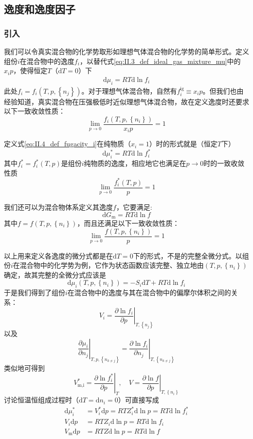 \documentclass[main.tex]{subfiles}
\begin{document}
\subsection{逸度和逸度因子}
\subsubsection{引入}
我们可以令真实混合物的化学势取形如理想气体混合物的化学势的简单形式。定义组份$i$在混合物中的逸度$f_i$，以替代式\eqref{eq:II.3_def_ideal_gas_mixture_mu}中的$x_ip$，使得恒定$T$（$\mathrm{d}T=0$）下
\begin{align}\label{eq:II.4_def_fugacity_i}
    \mathrm{d}\mu_i=RT\mathrm{d}\ln f_i
\end{align}
此处$f_i=f_i\left(T,p,\left\{n_j\right\}\right)$。对于理想气体混合物，自然有$f_i^\text{ig}\equiv x_i p$。但我们也由经验知道，真实混合物在压强极低时近似理想气体混合物，故在定义逸度时还要求以下一致收敛性质：
\[\lim_{p\to 0}\frac{f_i\left(T,p,\left\{n_i\right\}\right)}{x_i p}=1\]

定义式\eqref{eq:II.4_def_fugacity_i}在纯物质（$x_i=1$）时的形式就是（恒定$T$下）
\begin{equation}\label{eq:II.4_def_fugacity_i*}
    \mathrm{d}\mu_i^*=RT\mathrm{d}\ln f_i^*
\end{equation}
其中$f_i^*=f_i^*\left(T,p\right)$是组份$i$纯物质的逸度，相应地它也满足在$p\rightarrow 0$时的一致收敛性质
\[\lim_{p\to 0}\frac{f_i^*\left(T,p\right)}{p}=1\]

我们还可以为混合物体系定义其逸度$f$，它要满足:
\begin{equation}\label{II.4_def_fugacity_f}
    \mathrm{d}G_\text{m}=RT\mathrm{d}\ln f
\end{equation}
其中$f=f\left(T,p,\left\{n_i\right\}\right)$，而且还满足以下一致收敛性质：
\[\lim_{p\to 0}\frac{f\left(T,p,\left\{n_i\right\}\right)}{p}=1\]

以上用来定义各逸度的微分式都是在$\mathrm{d}T=0$下的形式，不是的完整全微分式。以组份$i$在混合物中的化学势为例，它作为状态函数应该完整、独立地由$\left(T,p,\left\{n_i\right\}\right)$确定，故其完整的全微分式应该是
\[\mathrm{d}\mu_i\left(T,p,\left\{n_i\right\}\right)=-S_i\mathrm{d}T+RT\mathrm{d}\ln f_i\]
于是我们得到了组份$i$在混合物中的逸度与其在混合物中的偏摩尔体积之间的关系：
\[V_i=\left.\frac{\partial\ln f_i}{\partial p}\right|_{T,\left\{n_j\right\}}\]
以及
\[\left.\frac{\partial\mu_i}{\partial n_j}\right|_{T,p,\left\{n_{k\neq j}\right\}}=\left.\frac{\partial\ln f_i}{\partial n_j}\right|_{T,\left\{n_{k\neq j}\right\}}\]
类似地可得到
\[V_\text{m,i}^*=\left.\frac{\partial\ln f_i^*}{\partial p}\right|_T,\quad V=\left.\frac{\partial\ln f}{\partial p}\right|_{T,\left\{n_i\right\}}\]
讨论恒温恒组成过程时（$\mathrm{d}T=\mathrm{d}n_i=0$）可直接写成
\begin{align*}
    \mathrm{d}\mu_i^*     & =V_i^*\mathrm{d}p=RTZ_i^*\mathrm{d}\ln p=RT\mathrm{d}\ln f_i^* \\
    V_i\mathrm{d}p        & =RTZ_i\mathrm{d}\ln p=RT\mathrm{d}\ln f_i                      \\
    V_\text{m}\mathrm{d}p & =RTZ\mathrm{d}\ln p=RT\mathrm{d}\ln f
\end{align*}
\end{document}
